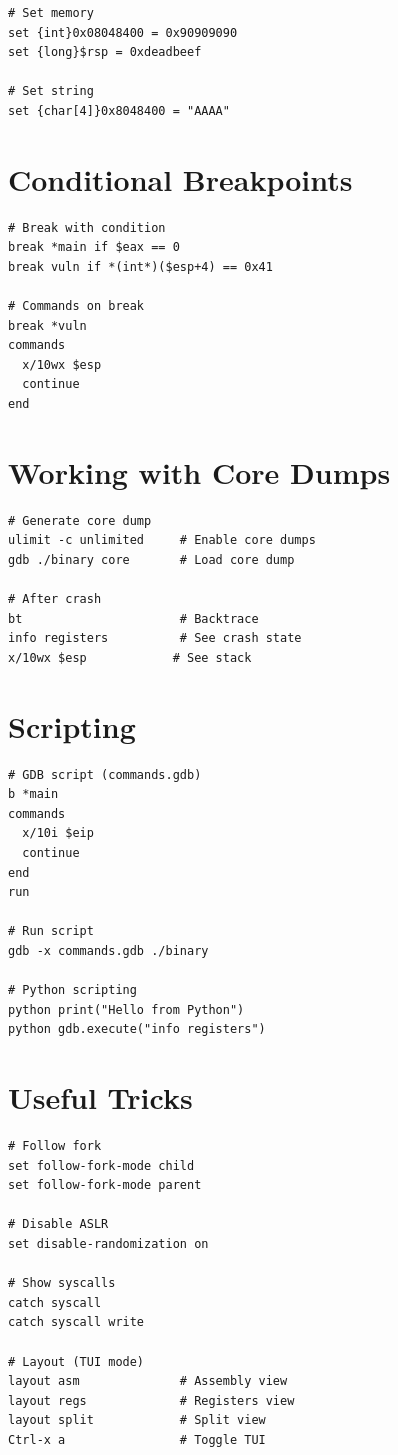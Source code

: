 \documentclass[10pt,landscape,a4paper]{article}
\begin{document}
\begin{multicols}{3}
\begin{lstlisting}
# Set memory
set {int}0x08048400 = 0x90909090
set {long}$rsp = 0xdeadbeef

# Set string
set {char[4]}0x8048400 = "AAAA"
\end{lstlisting}

\section*{Conditional Breakpoints}
\begin{lstlisting}
# Break with condition
break *main if $eax == 0
break vuln if *(int*)($esp+4) == 0x41

# Commands on break
break *vuln
commands
  x/10wx $esp
  continue
end
\end{lstlisting}

\section*{Working with Core Dumps}
\begin{lstlisting}
# Generate core dump
ulimit -c unlimited     # Enable core dumps
gdb ./binary core       # Load core dump

# After crash
bt                      # Backtrace
info registers          # See crash state
x/10wx $esp            # See stack
\end{lstlisting}

\section*{Scripting}
\begin{lstlisting}
# GDB script (commands.gdb)
b *main
commands
  x/10i $eip
  continue
end
run

# Run script
gdb -x commands.gdb ./binary

# Python scripting
python print("Hello from Python")
python gdb.execute("info registers")
\end{lstlisting}

\section*{Useful Tricks}
\begin{lstlisting}
# Follow fork
set follow-fork-mode child
set follow-fork-mode parent

# Disable ASLR
set disable-randomization on

# Show syscalls
catch syscall
catch syscall write

# Layout (TUI mode)
layout asm              # Assembly view
layout regs             # Registers view
layout split            # Split view
Ctrl-x a                # Toggle TUI


\end{lstlisting}
\end{multicols}
\end{document}
